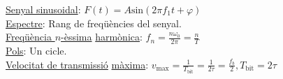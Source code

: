 \documentclass[12pt]{article}
\begin{document}
\begin{multicols}{4}
\underline{Senyal sinusoidal}: $F(t) = A\text{sin}(2\pi f_1t+ \varphi)$ \\
\underline{Espectre}: Rang de freqüències del senyal. \\
\underline{Freqüència $n$-èssima} \underline{harmònica}: $f_n = \frac{n\omega_0}{2\pi} = \frac{n}{T}$ \\
\underline{Pols}: Un cicle. \\
\underline{Velocitat de transmissió} \underline{màxima}: $v_\text{max} = \frac{1}{T_\text{bit}} = \frac{1}{2\tau} = \frac{f_b}{2}, T_{\text{bit}} = 2 \tau$ \\
\end{multicols}
\end{document}
